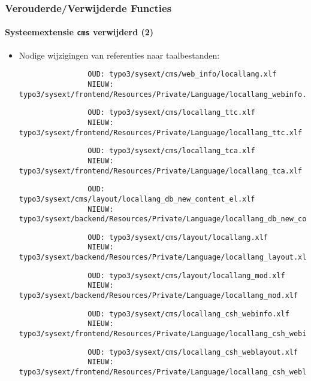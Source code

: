 \begin{frame}[fragile]
	\frametitle{Verouderde/Verwijderde Functies}
	\framesubtitle{Systeemextensie \texttt{cms} verwijderd (2)}

	\lstset{basicstyle=\tiny\ttfamily}

	\begin{itemize}

		\item Nodige wijzigingen van referenties naar taalbestanden:


			\begin{lstlisting}
				OUD: typo3/sysext/cms/web_info/locallang.xlf
				NIEUW: typo3/sysext/frontend/Resources/Private/Language/locallang_webinfo.xlf
			\end{lstlisting}
			\vspace{-0.3cm}
			\begin{lstlisting}
				OUD: typo3/sysext/cms/locallang_ttc.xlf
				NIEUW: typo3/sysext/frontend/Resources/Private/Language/locallang_ttc.xlf
			\end{lstlisting}
			\vspace{-0.3cm}
			\begin{lstlisting}
				OUD: typo3/sysext/cms/locallang_tca.xlf
				NIEUW: typo3/sysext/frontend/Resources/Private/Language/locallang_tca.xlf
			\end{lstlisting}
			\vspace{-0.3cm}
			\begin{lstlisting}
				OUD: typo3/sysext/cms/layout/locallang_db_new_content_el.xlf
				NIEUW: typo3/sysext/backend/Resources/Private/Language/locallang_db_new_content_el.xlf
			\end{lstlisting}
			\vspace{-0.3cm}
			\begin{lstlisting}
				OUD: typo3/sysext/cms/layout/locallang.xlf
				NIEUW: typo3/sysext/backend/Resources/Private/Language/locallang_layout.xlf
			\end{lstlisting}
			\vspace{-0.3cm}
			\begin{lstlisting}
				OUD: typo3/sysext/cms/layout/locallang_mod.xlf
				NIEUW: typo3/sysext/backend/Resources/Private/Language/locallang_mod.xlf
			\end{lstlisting}
			\vspace{-0.3cm}
			\begin{lstlisting}
				OUD: typo3/sysext/cms/locallang_csh_webinfo.xlf
				NIEUW: typo3/sysext/frontend/Resources/Private/Language/locallang_csh_webinfo.xlf
			\end{lstlisting}
			\vspace{-0.3cm}
			\begin{lstlisting}
				OUD: typo3/sysext/cms/locallang_csh_weblayout.xlf
				NIEUW: typo3/sysext/frontend/Resources/Private/Language/locallang_csh_weblayout.xlf
			\end{lstlisting}


\end{itemize}
\end{frame}
